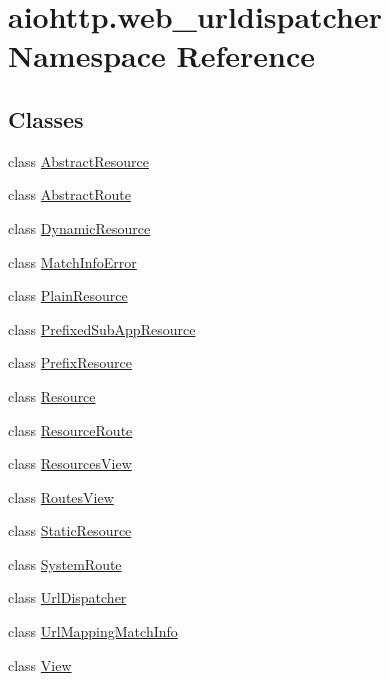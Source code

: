 \hypertarget{namespaceaiohttp_1_1web__urldispatcher}{}\section{aiohttp.\+web\+\_\+urldispatcher Namespace Reference}
\label{namespaceaiohttp_1_1web__urldispatcher}
\subsection*{Classes}
\begin{DoxyCompactItemize}
\item 
class \hyperlink{classaiohttp_1_1web__urldispatcher_1_1_abstract_resource}{Abstract\+Resource}
\item 
class \hyperlink{classaiohttp_1_1web__urldispatcher_1_1_abstract_route}{Abstract\+Route}
\item 
class \hyperlink{classaiohttp_1_1web__urldispatcher_1_1_dynamic_resource}{Dynamic\+Resource}
\item 
class \hyperlink{classaiohttp_1_1web__urldispatcher_1_1_match_info_error}{Match\+Info\+Error}
\item 
class \hyperlink{classaiohttp_1_1web__urldispatcher_1_1_plain_resource}{Plain\+Resource}
\item 
class \hyperlink{classaiohttp_1_1web__urldispatcher_1_1_prefixed_sub_app_resource}{Prefixed\+Sub\+App\+Resource}
\item 
class \hyperlink{classaiohttp_1_1web__urldispatcher_1_1_prefix_resource}{Prefix\+Resource}
\item 
class \hyperlink{classaiohttp_1_1web__urldispatcher_1_1_resource}{Resource}
\item 
class \hyperlink{classaiohttp_1_1web__urldispatcher_1_1_resource_route}{Resource\+Route}
\item 
class \hyperlink{classaiohttp_1_1web__urldispatcher_1_1_resources_view}{Resources\+View}
\item 
class \hyperlink{classaiohttp_1_1web__urldispatcher_1_1_routes_view}{Routes\+View}
\item 
class \hyperlink{classaiohttp_1_1web__urldispatcher_1_1_static_resource}{Static\+Resource}
\item 
class \hyperlink{classaiohttp_1_1web__urldispatcher_1_1_system_route}{System\+Route}
\item 
class \hyperlink{classaiohttp_1_1web__urldispatcher_1_1_url_dispatcher}{Url\+Dispatcher}
\item 
class \hyperlink{classaiohttp_1_1web__urldispatcher_1_1_url_mapping_match_info}{Url\+Mapping\+Match\+Info}
\item 
class \hyperlink{classaiohttp_1_1web__urldispatcher_1_1_view}{View}
\end{DoxyCompactItemize}
